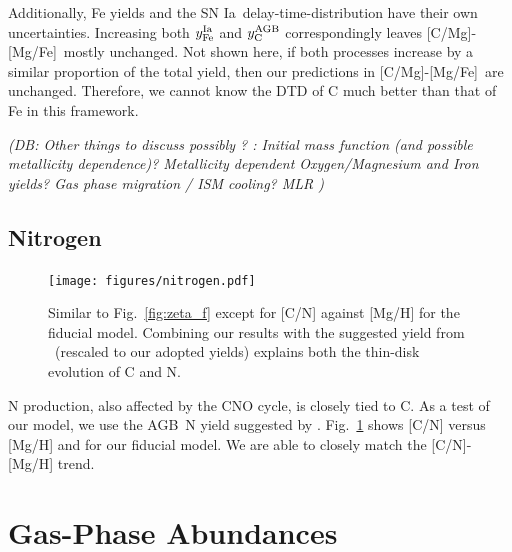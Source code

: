 \documentclass[fleqn,
usenatbib]{mnras}
\newcommand{\JJ}{\citetalias{james+21}}
\newcommand{\agb}{AGB}
\newcommand{\ia}{SN Ia}
\newcommand{\caafe}{[C/Mg]-[Mg/Fe]}
\newcommand{\Ycagb}{{y_{\rm C}^{\rm AGB}}}
\newcommand{\dbnote}[1]{ {\color{Thistle} \textit{\small (DB: #1)}} }
\begin{document}
Additionally, Fe yields and the \ia\  delay-time-distribution have their own uncertainties. Increasing both $y_{\rm Fe}^{\rm Ia}$ and $\Ycagb$ correspondingly leaves \caafe\ mostly unchanged. Not shown here, if both processes increase by a similar proportion of the total yield, then our predictions in \caafe\ are unchanged. Therefore, we cannot know the DTD of C much better than that of Fe in this framework.


\dbnote{Other things to discuss possibly ? :
 Initial mass function (and possible metallicity dependence)? Metallicity dependent Oxygen/Magnesium and Iron yields? Gas phase migration / ISM cooling?  MLR
 }


\subsection{Nitrogen}


\begin{figure}
\centering
\texttt{[image: figures/nitrogen.pdf]}

\caption[]{Similar to Fig.~\ref{fig:zeta_f} except for [C/N] against [Mg/H] for the fiducial model. Combining our results with the suggested yield from \JJ\ (rescaled to our adopted yields) explains both the thin-disk evolution of C and N. 
}
\label{fig:nitrogen}
\end{figure}

N production, also affected by the CNO cycle, is closely tied to C. As a test of our model, we use the \agb\ N yield suggested by \citet{james+23}. Fig.~\ref{fig:nitrogen} shows [C/N] versus [Mg/H] and for our fiducial model. We are able to closely match the [C/N]-[Mg/H] trend. 




\section{Gas-Phase Abundances}\label{sec:gas}
\end{document}
